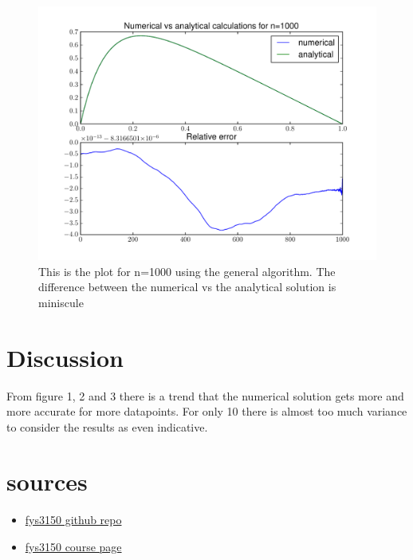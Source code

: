 \documentclass[10pt,a4paper]{article}
\begin{document}
    \begin{figure}
      \includegraphics[width = \textwidth]{general_1000}
      \caption{This is the plot for n=1000 using the general algorithm. The difference between the numerical vs the analytical solution is miniscule}
    \end{figure}

    \newpage{}
    \section{Discussion}
    From figure 1, 2 and 3 there is a trend that the numerical solution gets more and more accurate for more datapoints. For only 10 there is almost too much variance to consider the results as even indicative.

    \newpage{}
    \section{sources}
    \begin{itemize}
     \item
     \href{https://github.com/CompPhysics/ComputationalPhysics}{fys3150 github repo}
     \item \href{http://www.uio.no/studier/emner/matnat/fys/FYS3150/h17/index.html}{fys3150 course page}
    \end{itemize}
\end{document}
